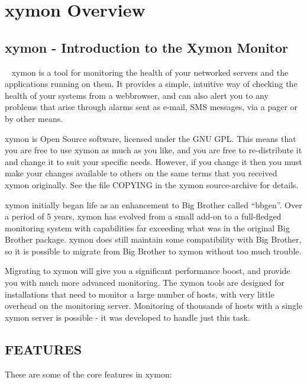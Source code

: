 %
\chapter{xymon Overview}
%
\section{xymon - Introduction to the Xymon Monitor}

~\cite{web:patchutils} xymon is a tool for monitoring the health of your networked servers
 and the applications running on them. It provides a simple, intuitive
 way of checking the health of your systems from a webbrowser, and can
 also alert you to any problems that arise through alarms sent as
 e-mail, SMS messages, via a pager or by other means. 


 xymon is Open Source software, licensed under the GNU GPL. This
 means that you are free to use xymon as much as you like, and you
 are free to re-distribute it and change it to suit your specific
 needs. However, if you change it then you must make your changes
 available to others on the same terms that you received xymon
 originally. See the file COPYING in the xymon source-archive for
 details. 

 xymon initially began life as an enhancement to Big Brother called
 ``bbgen''. Over a period of 5 years, xymon has evolved from a small
 add-on to a full-fledged monitoring system with capabilities far
 exceeding what was in the original Big Brother package. xymon does
 still maintain some compatibility with Big Brother, so it is
 possible to migrate from Big Brother to xymon without too much
 trouble. 

 Migrating to xymon will give you a significant performance boost,
 and provide you with much more advanced monitoring. The xymon tools
 are designed for installations that need to monitor a large number
 of hosts, with very little overhead on the monitoring
 server. Monitoring of thousands of hosts with a single xymon server
 is possible - it was developed to handle just this task. 

\section{FEATURES}
 These are some of the core features in xymon: 

